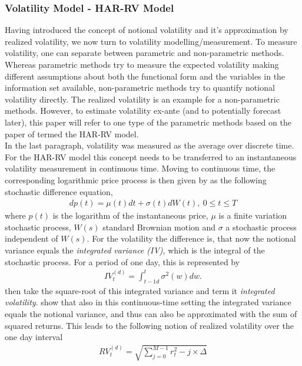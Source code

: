 \subsubsection{Volatility Model - HAR-RV Model}
Having introduced the concept of notional volatility and it's approximation by realized volatility, we now turn to volatility modelling/measurement. To measure volatility, one can separate between parametric and non-parametric methods. Whereas parametric methods try to measure the expected volatility making different assumptions about both the functional form and the variables in the information set available, non-parametric methods try to quantify notional volatility directly. The realized volatility is an example for a non-parametric methods. However, to estimate volatility ex-ante (and to potentially forecast later), this paper will refer to one type of the parametric methods based on the paper of \textcite{corsi2009} termed the HAR-RV model.\\
In the last paragraph, volatility was measured as the average over discrete time. For the HAR-RV model this concept needs to be transferred to an instantaneous volatility measurement in continuous time. Moving to continuous time, the corresponding logarithmic price process is then given by \textcite{corsi2009} as the following stochastic difference equation,
\begin{align}\label{eq:return-process-corsi}
dp(t) = \mu(t)dt + \sigma(t)dW(t), \ 0 \leq t \leq T
\end{align}
where $p(t)$ is the logarithm of the instantaneous price, $\mu$ is a finite variation stochastic process, $W(s)$ standard Brownian motion and $\sigma$ a stochastic process independent of $W(s)$. For the volatility the difference is, that now the notional variance equals the \emph{integrated variance (IV)}, which is the integral of the stochastic process. For a period of one day, this is represented by
\begin{align}
IV_{t}^{(d)} =  \int_{t-1d}^{t} \sigma^{2}(w)dw.
\end{align}
\textcite{corsi2009} then take the square-root of this integrated variance and term it \emph{integrated volatility}. \textcite{andersen2001} show that also in this continuous-time setting the integrated variance equals the notional variance, and thus can also be approximated with the sum of squared returns. This leads to the following notion of realized volatility over the one day interval
\begin{align}
RV_{t}^{(d)} = \sqrt{\sum_{j=0}^{M-1} r^{2}_t-j \times \Delta}
\end{align}
